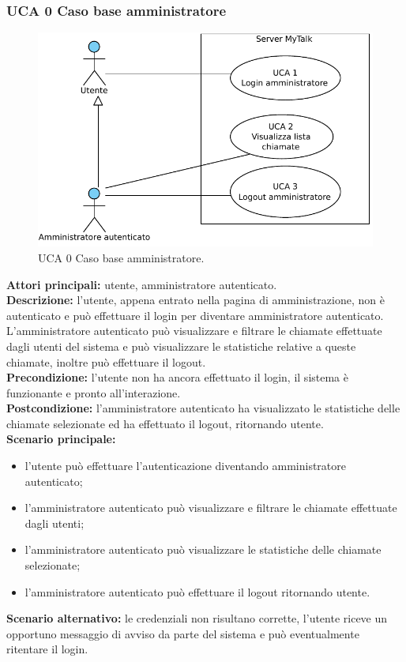 \subsubsection{UCA 0 Caso base amministratore}

\begin{figure}[htbp]
\centering
\includegraphics[scale=0.7]{./casi_uso/UCA0.pdf}
\caption{UCA 0 Caso base amministratore.}
\end{figure}

\noindent 
\textbf{Attori principali:} utente, amministratore autenticato.\\
\textbf{Descrizione:} l'utente, appena entrato nella pagina di amministrazione, non è autenticato e può effettuare il login per diventare amministratore autenticato. L'amministratore autenticato può visualizzare e filtrare le chiamate effettuate dagli utenti del sistema e può visualizzare le statistiche relative a queste chiamate, inoltre può effettuare il logout.\\
\textbf{Precondizione:} l'utente non ha ancora effettuato il login, il sistema è funzionante e pronto all'interazione.\\
\textbf{Postcondizione:} l'amministratore autenticato ha visualizzato le statistiche delle chiamate selezionate ed ha effettuato il logout, ritornando utente.\\
\textbf{Scenario principale:}
\begin{itemize}
\item l'utente può effettuare l'autenticazione diventando amministratore autenticato;
\item l'amministratore autenticato può visualizzare e filtrare le chiamate effettuate dagli utenti;
\item l'amministratore autenticato può visualizzare le statistiche delle chiamate selezionate;
\item l'amministratore autenticato può effettuare il logout ritornando utente.
\end{itemize}
\textbf{Scenario alternativo:} le credenziali non risultano corrette, l'utente riceve un opportuno messaggio di avviso da parte del sistema e può eventualmente ritentare il login.

